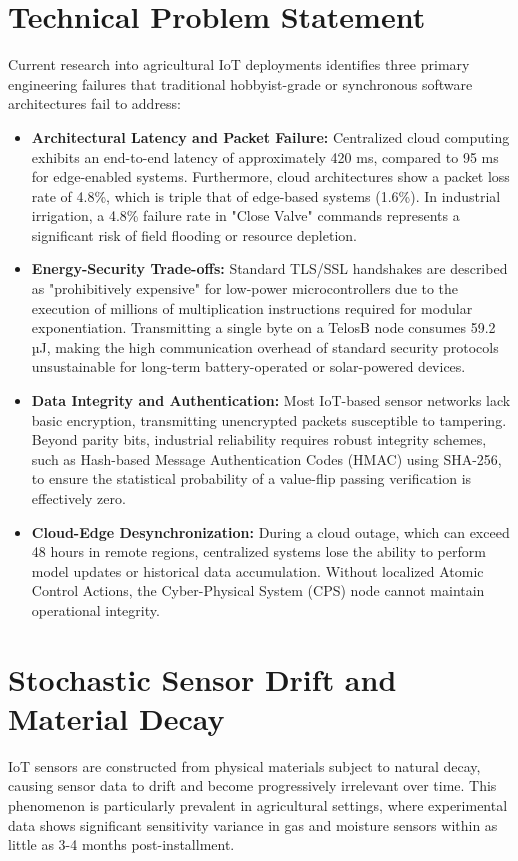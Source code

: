 \documentclass[conference]{IEEEtran}
\begin{document}
\section{Technical Problem Statement}
Current research into agricultural IoT deployments identifies three primary engineering failures that traditional hobbyist-grade or synchronous software architectures fail to address:
\begin{itemize}
    \item \textbf{Architectural Latency and Packet Failure:} Centralized cloud computing exhibits an end-to-end latency of approximately 420 ms, compared to 95 ms for edge-enabled systems. Furthermore, cloud architectures show a packet loss rate of 4.8\%, which is triple that of edge-based systems (1.6\%). In industrial irrigation, a 4.8\% failure rate in "Close Valve" commands represents a significant risk of field flooding or resource depletion.
    \item \textbf{Energy-Security Trade-offs:} Standard TLS/SSL handshakes are described as "prohibitively expensive" for low-power microcontrollers due to the execution of millions of multiplication instructions required for modular exponentiation. Transmitting a single byte on a TelosB node consumes 59.2 µJ, making the high communication overhead of standard security protocols unsustainable for long-term battery-operated or solar-powered devices.
    \item \textbf{Data Integrity and Authentication:} Most IoT-based sensor networks lack basic encryption, transmitting unencrypted packets susceptible to tampering. Beyond parity bits, industrial reliability requires robust integrity schemes, such as Hash-based Message Authentication Codes (HMAC) using SHA-256, to ensure the statistical probability of a value-flip passing verification is effectively zero.
    \item \textbf{Cloud-Edge Desynchronization:} During a cloud outage, which can exceed 48 hours in remote regions, centralized systems lose the ability to perform model updates or historical data accumulation. Without localized Atomic Control Actions, the Cyber-Physical System (CPS) node cannot maintain operational integrity.
\end{itemize}

\section{Stochastic Sensor Drift and Material Decay}

IoT sensors are constructed from physical materials subject to natural decay, causing sensor data to drift and become progressively irrelevant over time. This phenomenon is particularly prevalent in agricultural settings, where experimental data shows significant sensitivity variance in gas and moisture sensors within as little as 3-4 months post-installment.
\end{document}
